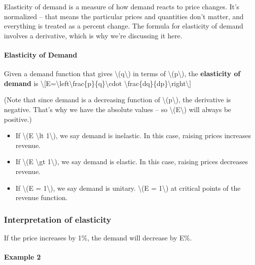 Elasticity of demand is a measure of how demand reacts to price changes.
It's normalized -- that means the particular prices and quantities don't
matter, and everything is treated as a percent change. The formula for
elasticity of demand involves a derivative, which is why we're
discussing it here.

\hypertarget{elasticity-of-demand}{%
\paragraph{Elasticity of Demand}\label{elasticity-of-demand}}

Given a demand function that gives \textbackslash{}(q\textbackslash{})
in terms of \textbackslash{}(p\textbackslash{}), the \textbf{elasticity
of demand} is
\textbackslash{}{[}E=\textbackslash{}left\textbar{}\textbackslash{}frac\{p\}\{q\}\textbackslash{}cdot
\textbackslash{}frac\{dq\}\{dp\}\textbackslash{}right\textbar{}\textbackslash{}{]}

(Note that since demand is a decreasing function of
\textbackslash{}(p\textbackslash{}), the derivative is negative. That's
why we have the absolute values -- so
\textbackslash{}(E\textbackslash{}) will always be positive.)

\begin{itemize}
\tightlist
\item
  If \textbackslash{}(E \textbackslash{}lt 1\textbackslash{}), we say
  demand is inelastic. In this case, raising prices increases revenue.
\item
  If \textbackslash{}(E \textbackslash{}gt 1\textbackslash{}), we say
  demand is elastic. In this case, raising prices decreases revenue.
\item
  If \textbackslash{}(E = 1\textbackslash{}), we say demand is unitary.
  \textbackslash{}(E = 1\textbackslash{}) at critical points of the
  revenue function.
\end{itemize}

\hypertarget{interpretation-of-elasticity}{%
\subsubsection{Interpretation of
elasticity}\label{interpretation-of-elasticity}}

If the price increases by 1\%, the demand will decrease by E\%.

\hypertarget{example-2}{%
\paragraph{Example 2}\label{example-2}}

